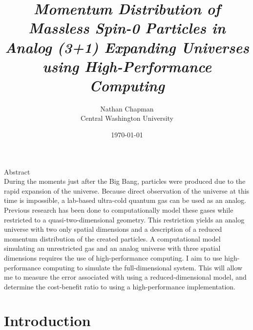 \documentclass{article}
\title{\Large \vspace{-0.625in} \emph{Momentum Distribution of Massless Spin-0 Particles in Analog (3+1) Expanding Universes using High-Performance Computing} \vspace{-0.15in}}
\author{Nathan Chapman \\ {\normalsize Central Washington University}}
\date{\vspace{-0.1in}\today}
\begin{document}
\maketitle

\begin{center}
    Abstract \\
    During the moments just after the Big Bang, particles were produced due to the rapid expansion of the universe. Because direct observation of the universe at this time is impossible, a lab-based ultra-cold quantum gas can be used as an analog.  Previous research has been done to computationally model these gases while restricted to a quasi-two-dimensional geometry.  This restriction yields an analog universe with two only spatial dimensions and a description of a reduced momentum distribution of the created particles.  A computational model simulating an unrestricted gas and an analog universe with three spatial dimensions requires the use of high-performance computing.  I aim to use high-performance computing to simulate the full-dimensional system. This will allow me to measure the error associated with using a reduced-dimensional model, and determine the cost-benefit ratio to using a high-performance implementation.
        
        
        
\end{center}

\tableofcontents

\pagebreak

\section{Introduction} \label{sec:intro}
\end{document}
